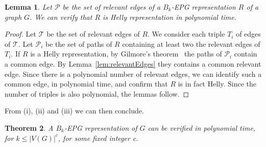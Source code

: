\documentclass[preprint,12pt]{elsarticle} %
\newtheorem{theorem}{Theorem}
\newtheorem{lema}[theorem]{Lemma}
\begin{document}
\begin{lema}
Let $\mathcal{P}$ be the set of relevant edges of a $B_k$-EPG representation $R$ of a graph $G$. We can verify that $R$ is Helly representation in polynomial time.
\end{lema}

\begin{proof}
Let $\mathcal{T}$ be the set of relevant edges of $R$. We consider each triple $T_i$ of edges of $\mathcal{T}$. Let $\mathcal{P}_i$ be the set of paths of $R$ containing at least two the relevant edges of $T_i$. If $R$ is a Helly representation, by Gilmore's theorem~\citep{bergeDuchet1975} the paths of $\mathcal{P}_i$  contain a common edge.  By Lemma~\ref{lem:relevantEdges} they contains a common relevant edge. Since there is a polynomial number of relevant edges, we can identify such a common edge, in polynomial time, and confirm that $R$ is in fact Helly. Since the number of triples is also polynomial, the lemmas follow.
\end{proof}

From (i), (ii) and (iii) we can then conclude.

\begin{theorem} \label{teo:npdificuldade}
A $B_k$-EPG representation of $G$ can be verified in polynomial time, for $k\leq |V(G)|^c$, for some fixed integer c.
\end{theorem}




\end{document}
